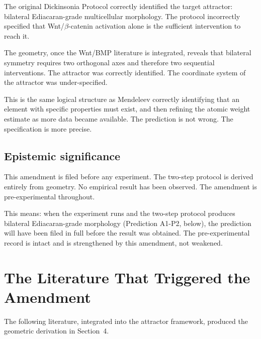 \documentclass[12pt, a4paper]{article}
\theoremstyle{definition}
\theoremstyle{remark}
\begin{document}
The original Dickinsonia Protocol correctly identified the
target attractor: bilateral Ediacaran-grade multicellular
morphology. The protocol incorrectly specified that
Wnt/$\beta$-catenin activation alone is the sufficient
intervention to reach it.

The geometry, once the Wnt/BMP literature is integrated,
reveals that bilateral symmetry requires two orthogonal axes
and therefore two sequential interventions. The attractor
was correctly identified. The coordinate system of the
attractor was under-specified.

This is the same logical structure as Mendeleev correctly
identifying that an element with specific properties must
exist, and then refining the atomic weight estimate as
more data became available. The prediction is not wrong.
The specification is more precise.

\subsection{Epistemic significance}

This amendment is filed before any experiment. The
two-step protocol is derived entirely from geometry. No
empirical result has been observed. The amendment is
pre-experimental throughout.

This means: when the experiment runs and the two-step
protocol produces bilateral Ediacaran-grade morphology
(Prediction A1-P2, below), the prediction will have been
filed in full before the result was obtained. The
pre-experimental record is intact and is strengthened
by this amendment, not weakened.

\section{The Literature That Triggered the Amendment}

The following literature, integrated into the attractor
framework, produced the geometric derivation in Section~4.
\end{document}
